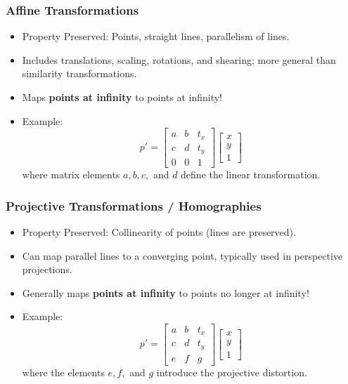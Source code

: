 \documentclass[8pt, a4paper, landscape, includeheadfoot]{extarticle}
\begin{document}
\begin{multicols*}{4}
	\subsubsection{Affine Transformations}{}
	\begin{itemize}[itemsep=0pt, leftmargin=8pt]
		\item Property Preserved: Points, straight lines, parallelism of lines.
		\item Includes translations, scaling, rotations, and shearing; more general than similarity transformations.
		\item Maps \textbf{points at infinity} to points at infinity!
		\item Example:
		      $$p' = \begin{bmatrix} a & b & t_x \\ c & d & t_y \\ 0 & 0 & 1 \end{bmatrix} \begin{bmatrix} x \\ y \\ 1 \end{bmatrix} $$
		      where matrix elements \( a, b, c, \) and \( d \) define the linear transformation.
	\end{itemize}

	\subsubsection{Projective Transformations / Homographies}{}
	\begin{itemize}[itemsep=0pt, leftmargin=8pt]
		\item Property Preserved: Collinearity of points (lines are preserved).
		\item Can map parallel lines to a converging point, typically used in perspective projections.
		\item Generally maps \textbf{points at infinity} to points no longer at infinity!
		\item Example:
		      $$
			      p' = \begin{bmatrix} a & b & t_x \\ c & d & t_y \\ e & f & g \end{bmatrix} \begin{bmatrix} x \\ y \\ 1 \end{bmatrix}
		      $$
		      where the elements \( e, f, \) and \( g \) introduce the projective distortion.
	\end{itemize}


\end{multicols*}
\end{document}
